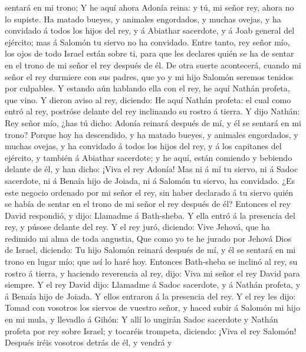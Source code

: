 sentará en mi trono;  Y he aquí ahora Adonía reina: y tú,
mi señor rey, ahora no lo supiste.  Ha matado bueyes, y
animales engordados, y muchas ovejas, y ha convidado á todos los hijos
del rey, y á Abiathar sacerdote, y á Joab general del ejército; mas á
Salomón tu siervo no ha convidado.  Entre tanto, rey señor
mío, los ojos de todo Israel están sobre ti, para que les declares quién
se ha de sentar en el trono de mi señor el rey después de él.
 De otra suerte acontecerá, cuando mi señor el rey durmiere
con sus padres, que yo y mi hijo Salomón seremos tenidos por culpables.
 Y estando aún hablando ella con el rey, he aquí Nathán
profeta, que vino.  Y dieron aviso al rey, diciendo: He
aquí Nathán profeta: el cual como entró al rey, postróse delante del rey
inclinando su rostro á tierra.  Y dijo Nathán: Rey señor
mío, ¿has tú dicho: Adonía reinará después de mí, y él se sentará en mi
trono?  Porque hoy ha descendido, y ha matado bueyes, y
animales engordados, y muchas ovejas, y ha convidado á todos los hijos
del rey, y á los capitanes del ejército, y también á Abiathar sacerdote;
y he aquí, están comiendo y bebiendo delante de él, y han dicho: ¡Viva
el rey Adonía!  Mas ni á mí tu siervo, ni á Sadoc
sacerdote, ni á Benaía hijo de Joiada, ni á Salomón tu siervo, ha
convidado.  ¿Es este negocio ordenado por mi señor el rey,
sin haber declarado á tu siervo quién se había de sentar en el trono de
mi señor el rey después de él?  Entonces el rey David
respondió, y dijo: Llamadme á Bath-sheba. Y ella entró á la presencia
del rey, y púsose delante del rey.  Y el rey juró,
diciendo: Vive Jehová, que ha redimido mi alma de toda angustia,
 Que como yo te he jurado por Jehová Dios de Israel,
diciendo: Tu hijo Salomón reinará después de mí, y él se sentará en mi
trono en lugar mío; que así lo haré hoy.  Entonces
Bath-sheba se inclinó al rey, su rostro á tierra, y haciendo reverencia
al rey, dijo: Viva mi señor el rey David para siempre.  Y
el rey David dijo: Llamadme á Sadoc sacerdote, y á Nathán profeta, y á
Benaía hijo de Joiada. Y ellos entraron á la presencia del rey.
 Y el rey les dijo: Tomad con vosotros los siervos de
vuestro señor, y haced subir á Salomón mi hijo en mi mula, y llevadlo á
Gihón:  Y allí lo ungirán Sadoc sacerdote y Nathán profeta
por rey sobre Israel; y tocaréis trompeta, diciendo: ¡Viva el rey
Salomón!  Después iréis vosotros detrás de él, y vendrá y

